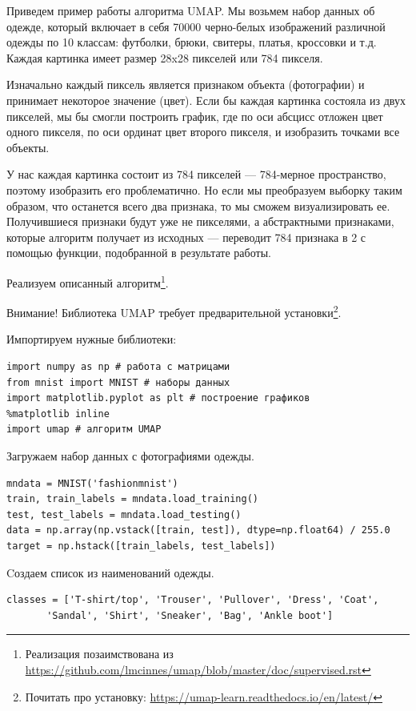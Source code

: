 	Приведем пример работы алгоритма UMAP. Мы возьмем набор данных об одежде, который включает в себя 70000 черно-белых изображений различной одежды по 10 классам: футболки, брюки, свитеры, платья, кроссовки и т.д. Каждая картинка имеет размер 28x28 пикселей или 784 пикселя.
	
	Изначально каждый пиксель является признаком объекта (фотографии) и принимает некоторое значение (цвет). Если бы каждая картинка состояла из двух пикселей, мы бы смогли построить график, где по оси абсцисс отложен цвет одного пикселя, по оси ординат цвет второго пикселя, и изобразить точками все объекты.
	
	У нас каждая картинка состоит из 784 пикселей --- 784-мерное пространство, поэтому изобразить его проблематично. Но если мы преобразуем выборку таким образом, что останется всего два признака, то мы сможем визуализировать ее. Получившиеся признаки будут уже не пикселями, а абстрактными признаками, которые алгоритм получает из исходных --- переводит 784 признака в 2 с помощью функции, подобранной в результате работы.
	
	Реализуем описанный алгоритм\footnote{Реализация позаимствована из \url{https://github.com/lmcinnes/umap/blob/master/doc/supervised.rst}}.
	
	Внимание! Библиотека UMAP требует предварительной установки\footnote{Почитать про установку: \url{https://umap-learn.readthedocs.io/en/latest/}}.
	
	Импортируем нужные библиотеки:
	\begin{verbatim}
import numpy as np # работа с матрицами
from mnist import MNIST # наборы данных
import matplotlib.pyplot as plt # построение графиков
%matplotlib inline
import umap # алгоритм UMAP
	\end{verbatim}
	
	Загружаем набор данных с фотографиями одежды.
	\begin{verbatim}
mndata = MNIST('fashionmnist')
train, train_labels = mndata.load_training() 
test, test_labels = mndata.load_testing()
data = np.array(np.vstack([train, test]), dtype=np.float64) / 255.0
target = np.hstack([train_labels, test_labels])
	\end{verbatim}

	Cоздаем список из наименований одежды.
\begin{verbatim}
classes = ['T-shirt/top', 'Trouser', 'Pullover', 'Dress', 'Coat', 
	   'Sandal', 'Shirt', 'Sneaker', 'Bag', 'Ankle boot']
\end{verbatim}

